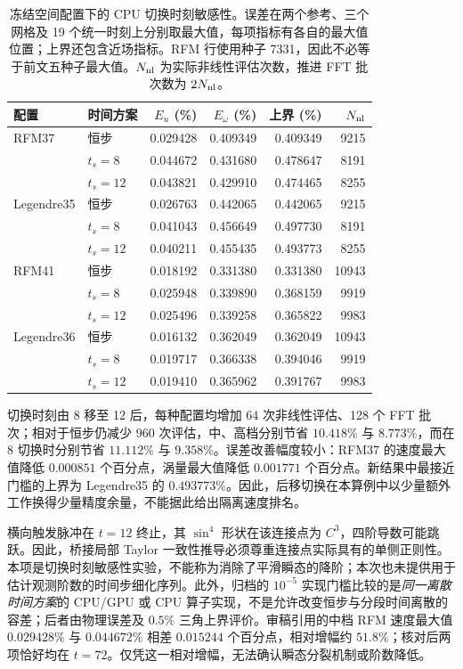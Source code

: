 \begin{table}[htbp]
\centering\small
\begin{tabular}{llrrrr}
\hline
配置 & 时间方案 & $E_u$ (\%) & $E_\omega$ (\%) & 上界 (\%) & $N_{\rm nl}$\\
\hline
RFM37 & 恒步 & 0.029428 & 0.409349 & 0.409349 & 9215\\
 & $t_s=8$ & 0.044672 & 0.431680 & 0.478647 & 8191\\
 & $t_s=12$ & 0.043821 & 0.429910 & 0.474465 & 8255\\
Legendre35 & 恒步 & 0.026763 & 0.442065 & 0.442065 & 9215\\
 & $t_s=8$ & 0.041043 & 0.456649 & 0.497730 & 8191\\
 & $t_s=12$ & 0.040211 & 0.455435 & 0.493773 & 8255\\
RFM41 & 恒步 & 0.018192 & 0.331380 & 0.331380 & 10943\\
 & $t_s=8$ & 0.025948 & 0.339890 & 0.368159 & 9919\\
 & $t_s=12$ & 0.025496 & 0.339258 & 0.365822 & 9983\\
Legendre36 & 恒步 & 0.016132 & 0.362049 & 0.362049 & 10943\\
 & $t_s=8$ & 0.019717 & 0.366338 & 0.394046 & 9919\\
 & $t_s=12$ & 0.019410 & 0.365962 & 0.391767 & 9983\\
\hline
\end{tabular}
\caption{冻结空间配置下的 CPU 切换时刻敏感性。误差在两个参考、三个网格及 19 个统一时刻上分别取最大值，每项指标有各自的最大值位置；上界还包含近场指标。RFM 行使用种子 7331，因此不必等于前文五种子最大值。$N_{\rm nl}$ 为实际非线性评估次数，推进 FFT 批次数为 $2N_{\rm nl}$。}
\label{tab:review-switch12}
\end{table}

切换时刻由 8 移至 12 后，每种配置均增加 64 次非线性评估、128 个 FFT 批次；相对于恒步仍减少 960 次评估，中、高档分别节省 $10.418\%$ 与 $8.773\%$，而在 8 切换时分别节省 $11.112\%$ 与 $9.358\%$。误差改善幅度较小：RFM37 的速度最大值降低 $0.000851$ 个百分点，涡量最大值降低 $0.001771$ 个百分点。新结果中最接近门槛的上界为 Legendre35 的 $0.493773\%$。因此，后移切换在本算例中以少量额外工作换得少量精度余量，不能据此给出隔离速度排名。

横向触发脉冲在 $t=12$ 终止，其 $\sin^4$ 形状在该连接点为 $C^3$，四阶导数可能跳跃。因此，桥接局部 Taylor 一致性推导必须尊重连接点实际具有的单侧正则性。本项是切换时刻敏感性实验，不能称为消除了平滑瞬态的降阶；本次也未提供用于估计观测阶数的时间步细化序列。此外，归档的 $10^{-5}$ 实现门槛比较的是\emph{同一离散时间方案}的 CPU/GPU 或 CPU 算子实现，不是允许改变恒步与分段时间离散的容差；后者由物理误差及 $0.5\%$ 三角上界评价。审稿引用的中档 RFM 速度最大值 $0.029428\%$ 与 $0.044672\%$ 相差 $0.015244$ 个百分点，相对增幅约 $51.8\%$；核对后两项恰好均在 $t=72$。仅凭这一相对增幅，无法确认瞬态分裂机制或阶数降低。
